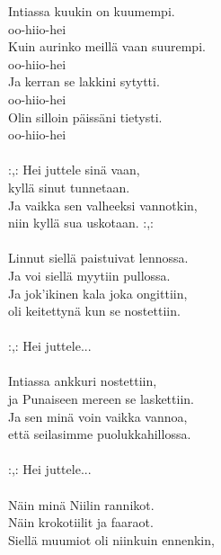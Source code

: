 
        Intiassa kuukin on kuumempi. \\
        oo-hiio-hei \\
        Kuin aurinko meillä vaan suurempi. \\
        oo-hiio-hei \\
        Ja kerran se lakkini sytytti. \\
        oo-hiio-hei \\
        Olin silloin päissäni tietysti. \\
        oo-hiio-hei \\
\hspace{10mm} \\
        :,: Hei juttele sinä vaan, \\
        kyllä sinut tunnetaan. \\
        Ja vaikka sen valheeksi vannotkin, \\
        niin kyllä sua uskotaan. :,: \\
\hspace{10mm} \\
        Linnut siellä paistuivat lennossa. \\
        Ja voi siellä myytiin pullossa. \\
        Ja jok'ikinen kala joka ongittiin, \\
        oli keitettynä kun se nostettiin. \\
\hspace{10mm} \\
        :,: Hei juttele... \\
\hspace{10mm} \\
        Intiassa ankkuri nostettiin, \\
        ja Punaiseen mereen se laskettiin. \\
        Ja sen minä voin vaikka vannoa, \\
        että seilasimme puolukkahillossa. \\
\hspace{10mm} \\
        :,: Hei juttele... \\
\hspace{10mm} \\
        Näin minä Niilin rannikot. \\
        Näin krokotiilit ja faaraot. \\
        Siellä muumiot oli niinkuin ennenkin, \\
